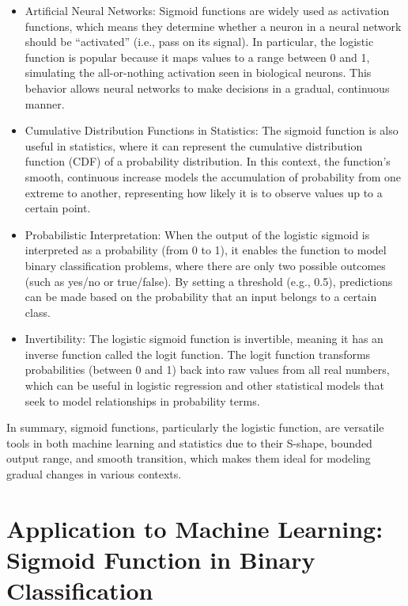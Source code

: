 \documentclass[
  12 pt,
  a4paper,
]{book}
\numberwithin{equation}{section}
\theoremstyle{plain}      %
\theoremstyle{definition} %
\theoremstyle{remark}     %
\theoremstyle{note}         %
\begin{document}
\begin{itemize}
\item
  Artificial Neural Networks: Sigmoid functions are widely used as
  activation functions, which means they determine whether a neuron in a
  neural network should be ``activated'' (i.e., pass on its signal). In
  particular, the logistic function is popular because it maps values to
  a range between 0 and 1, simulating the all-or-nothing activation seen
  in biological neurons. This behavior allows neural networks to make
  decisions in a gradual, continuous manner.
\item
  Cumulative Distribution Functions in Statistics: The sigmoid function
  is also useful in statistics, where it can represent the cumulative
  distribution function (CDF) of a probability distribution. In this
  context, the function's smooth, continuous increase models the
  accumulation of probability from one extreme to another, representing
  how likely it is to observe values up to a certain point.
\item
  Probabilistic Interpretation: When the output of the logistic sigmoid
  is interpreted as a probability (from 0 to 1), it enables the function
  to model binary classification problems, where there are only two
  possible outcomes (such as yes/no or true/false). By setting a
  threshold (e.g., 0.5), predictions can be made based on the
  probability that an input belongs to a certain class.
\item
  Invertibility: The logistic sigmoid function is invertible, meaning it
  has an inverse function called the logit function. The logit function
  transforms probabilities (between 0 and 1) back into raw values from
  all real numbers, which can be useful in logistic regression and other
  statistical models that seek to model relationships in probability
  terms.
\end{itemize}

In summary, sigmoid functions, particularly the logistic function, are
versatile tools in both machine learning and statistics due to their
S-shape, bounded output range, and smooth transition, which makes them
ideal for modeling gradual changes in various contexts.

\hypertarget{application-to-machine-learning-sigmoid-function-in-binary-classification}{%
\section{Application to Machine Learning: Sigmoid Function in Binary
Classification}\label{application-to-machine-learning-sigmoid-function-in-binary-classification}}
\end{document}
